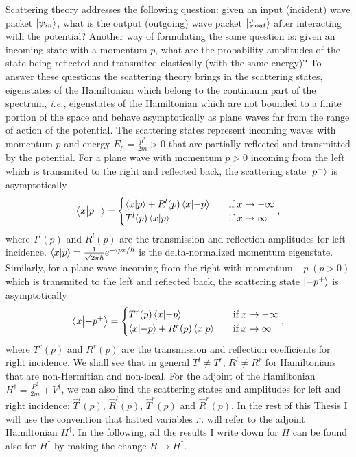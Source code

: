 Scattering theory addresses the following question: given an input (incident) wave packet $\ket{\psi_{in}}$, what is the output (outgoing) wave packet $\ket{\psi_{out}}$ after interacting with the potential? Another way of formulating the same question is: given an incoming state with a momentum $p$, what are the probability amplitudes of the state being reflected and transmited elastically (with the same energy)? To answer these questions the scattering theory brings in the scattering states, eigenstates of the Hamiltonian which belong to the continuum part of the spectrum, \textit{i.e.}, eigenstates of the Hamiltonian which are not bounded to a finite portion of the space and behave asymptotically as plane waves far from the range of action of the potential. The scattering states represent incoming waves with momentum $p$ and energy $E_p = \frac{p^2}{2m}>0$ that are partially reflected and transmitted by the potential. For a plane wave with momentum $p>0$ incoming from the left which is transmited to the right and reflected back, the scattering state $\ket{p^+}$ is asymptotically
%
\begin{equation}
  \braket{x}{p^+} =
  \begin{cases}
    \braket{x}{p} + R^l(p)\braket{x}{-p} \quad &\text{if}\; x \to -\infty
    \\
    T^l(p) \braket{x}{p} \quad &\text{if}\; x \to \infty
  \end{cases},
  \label{eq:chapter1_leftState}
\end{equation}
%
where $T^l(p)$ and $R^l(p)$ are the transmission and reflection amplitudes for left incidence. $\braket{x}{p} = \frac{1}{ \sqrt{2\pi\hbar} } e^{-i p x /\hbar} $ is the delta-normalized momentum eigenstate. Similarly, for a plane wave incoming from the right with momentum $-p \;(p>0)$ which is transmited to the left and reflected back, the scattering state $\ket{-p^+}$ is asymptotically
%
\begin{equation}
  \braket{x}{-p^+} =
  \begin{cases}
    T^r(p) \braket{x}{-p} \quad &\text{if}\; x \to -\infty
    \\
    \braket{x}{-p} + R^r(p)\braket{x}{p} \quad &\text{if}\; x \to \infty
  \end{cases},
  \label{eq:chapter1_rightState}
\end{equation}
%
where $T^r(p)$ and $R^r(p)$ are the transmission and reflection coefficients for right incidence. We shall see that in general $T^l\neq T^r$, $R^l\neq R^r$ for Hamiltonians that are non-Hermitian and non-local. For the adjoint of the Hamiltonian $H^\dagger = \frac{P^2}{2m} + V^\dagger$, we can also find the scattering states and amplitudes for left and right incidence: $\widehat{T}^l(p)$, $\widehat{R}^l(p)$, $\widehat{T}^r(p)$ and $\widehat{R}^r(p)$. In the rest of this Thesis I will use the convention that hatted variables $\widehat{...}$ will refer to the adjoint Hamiltonian $H^\dagger$. In the following, all the results I write down for $H$ can be found also for $H^\dagger$ by making the change $H \to H^\dagger$.

